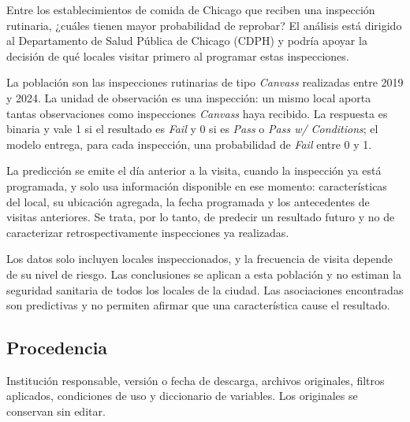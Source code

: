 \documentclass[
  spanish,
  letterpaper,
  DIV=11,
  numbers=noendperiod]{scrartcl}
\begin{document}
Entre los establecimientos de comida de Chicago que reciben una
inspección rutinaria, ¿cuáles tienen mayor probabilidad de reprobar? El
análisis está dirigido al Departamento de Salud Pública de Chicago
(CDPH) y podría apoyar la decisión de qué locales visitar primero al
programar estas inspecciones.

La población son las inspecciones rutinarias de tipo \emph{Canvass}
realizadas entre 2019 y 2024. La unidad de observación es una
inspección: un mismo local aporta tantas observaciones como inspecciones
\emph{Canvass} haya recibido. La respuesta es binaria y vale 1 si el
resultado es \emph{Fail} y 0 si es \emph{Pass} o \emph{Pass w/
Conditions}; el modelo entrega, para cada inspección, una probabilidad
de \emph{Fail} entre 0 y 1.

La predicción se emite el día anterior a la visita, cuando la inspección
ya está programada, y solo usa información disponible en ese momento:
características del local, su ubicación agregada, la fecha programada y
los antecedentes de visitas anteriores. Se trata, por lo tanto, de
predecir un resultado futuro y no de caracterizar retrospectivamente
inspecciones ya realizadas.

Los datos solo incluyen locales inspeccionados, y la frecuencia de
visita depende de su nivel de riesgo. Las conclusiones se aplican a esta
población y no estiman la seguridad sanitaria de todos los locales de la
ciudad. Las asociaciones encontradas son predictivas y no permiten
afirmar que una característica cause el resultado.

\subsection{Procedencia}\label{procedencia}

\begin{tcolorbox}[enhanced jigsaw, toptitle=1mm, bottomrule=.15mm, breakable, opacityback=0, title=\textcolor{quarto-callout-important-color}{\faExclamation}\hspace{0.5em}{Qué exige (enunciado 2.2.1)}, toprule=.15mm, bottomtitle=1mm, colframe=quarto-callout-important-color-frame, rightrule=.15mm, titlerule=0mm, colback=white, arc=.35mm, left=2mm, opacitybacktitle=0.6, coltitle=black, leftrule=.75mm, colbacktitle=quarto-callout-important-color!10!white]

Institución responsable, versión o fecha de descarga, archivos
originales, filtros aplicados, condiciones de uso y diccionario de
variables. Los originales se conservan sin editar.

\end{tcolorbox}
\end{document}

